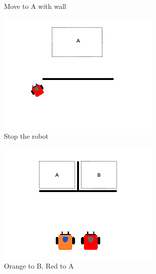 \documentclass[]{article}
\begin{document}
\begin{figure}
\begin{subfigure}{0.42\textwidth}
		\caption{Move to A with wall}
		\label{fig:sub2}
	\end{subfigure}
	\begin{subfigure}{0.42\textwidth}
		\centering
		\includegraphics[width=\linewidth]{slide_images/Swarm_Robot_Control_-_Single_Robot_0007.png}
		\caption{Stop the robot}
		\label{fig:sub1}
	\end{subfigure}%
	\begin{subfigure}{0.42\textwidth}
		\centering
		\includegraphics[width=\linewidth]{slide_images/Swarm_Robot_Control_-_Single_Robot_0009.png}
		\caption{Orange to B, Red to A}
		\label{fig:sub2}
	\end{subfigure}
	\begin{subfigure}{0.42\textwidth}

\end{subfigure}
\end{figure}
\end{document}
